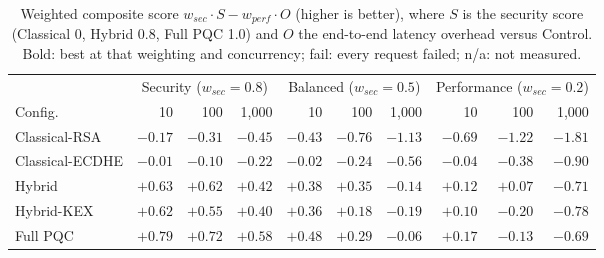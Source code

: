 \begin{table}[t]
\centering
\caption{Weighted composite score $w_{sec}\cdot S - w_{perf}\cdot O$ (higher is better), where $S$ is the security score (Classical 0, Hybrid 0.8, Full PQC 1.0) and $O$ the end-to-end latency overhead versus Control. Bold: best at that weighting and concurrency; fail: every request failed; n/a: not measured.}
\label{tab:tradeoff}
\setlength{\tabcolsep}{4pt}
\begin{tabular}{@{}lrrrrrrrrr@{}}
\toprule
 & \multicolumn{3}{c}{Security ($w_{sec}{=}0.8$)} & \multicolumn{3}{c}{Balanced ($w_{sec}{=}0.5$)} & \multicolumn{3}{c}{Performance ($w_{sec}{=}0.2$)} \\
\cmidrule(lr){2-4}\cmidrule(lr){5-7}\cmidrule(lr){8-10}
Config. & 10 & 100 & 1,000 & 10 & 100 & 1,000 & 10 & 100 & 1,000 \\
\midrule
Classical-RSA & $-0.17$ & $-0.31$ & $-0.45$ & $-0.43$ & $-0.76$ & $-1.13$ & $-0.69$ & $-1.22$ & $-1.81$ \\
Classical-ECDHE & $-0.01$ & $-0.10$ & $-0.22$ & $-0.02$ & $-0.24$ & $-0.56$ & $-0.04$ & $-0.38$ & $-0.90$ \\
Hybrid & $+0.63$ & $+0.62$ & $+0.42$ & $+0.38$ & $\mathbf{+0.35}$ & $-0.14$ & $+0.12$ & $\mathbf{+0.07}$ & $-0.71$ \\
Hybrid-KEX & $+0.62$ & $+0.55$ & $+0.40$ & $+0.36$ & $+0.18$ & $-0.19$ & $+0.10$ & $-0.20$ & $-0.78$ \\
Full PQC & $\mathbf{+0.79}$ & $\mathbf{+0.72}$ & $\mathbf{+0.58}$ & $\mathbf{+0.48}$ & $+0.29$ & $\mathbf{-0.06}$ & $\mathbf{+0.17}$ & $-0.13$ & $\mathbf{-0.69}$ \\
\bottomrule
\end{tabular}
\end{table}
